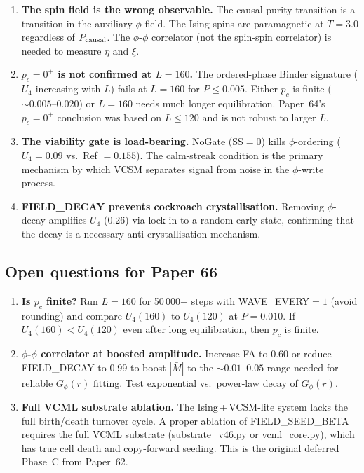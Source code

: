 \documentclass[12pt,a4paper]{article}
\begin{document}
\begin{enumerate}
  \item \textbf{The spin field is the wrong observable.}
    The causal-purity transition is a transition in the auxiliary $\phi$-field.
    The Ising spins are paramagnetic at $T=3.0$ regardless of $P_{\rm causal}$.
    The $\phi$-$\phi$ correlator (not the spin-spin correlator) is needed to measure $\eta$ and $\xi$.

  \item \textbf{$p_c = 0^+$ is not confirmed at $L=160$.}
    The ordered-phase Binder signature ($U_4$ increasing with $L$) fails
    at $L=160$ for $P \leq 0.005$.
    Either $p_c$ is finite ($\sim 0.005$--$0.020$) or $L=160$ needs much longer equilibration.
    Paper~64's $p_c = 0^+$ conclusion was based on $L \leq 120$ and is not robust to larger $L$.

  \item \textbf{The viability gate is load-bearing.}
    NoGate (SS$=0$) kills $\phi$-ordering ($U_4 = 0.09$ vs.\ Ref $= 0.155$).
    The calm-streak condition is the primary mechanism by which VCSM
    separates signal from noise in the $\phi$-write process.

  \item \textbf{FIELD\_DECAY prevents cockroach crystallisation.}
    Removing $\phi$-decay amplifies $U_4$ ($0.26$) via lock-in to a random early state,
    confirming that the decay is a necessary anti-crystallisation mechanism.
\end{enumerate}

\subsection{Open questions for Paper 66}

\begin{enumerate}
  \item \textbf{Is $p_c$ finite?}
    Run $L=160$ for 50\,000+ steps with WAVE\_EVERY$=1$ (avoid rounding)
    and compare $U_4(160)$ to $U_4(120)$ at $P = 0.010$.
    If $U_4(160) < U_4(120)$ even after long equilibration,
    then $p_c$ is finite.

  \item \textbf{$\phi$-$\phi$ correlator at boosted amplitude.}
    Increase FA to 0.60 or reduce FIELD\_DECAY to 0.99 to boost $|\bar{M}|$
    to the $\sim 0.01$--$0.05$ range needed for reliable $G_\phi(r)$ fitting.
    Test exponential vs.\ power-law decay of $G_\phi(r)$.

  \item \textbf{Full VCML substrate ablation.}
    The Ising\,+\,VCSM-lite system lacks the full birth/death turnover cycle.
    A proper ablation of FIELD\_SEED\_BETA requires the full VCML substrate
    (substrate\_v46.py or vcml\_core.py), which has true cell death and
    copy-forward seeding. This is the original deferred Phase~C from Paper~62.
\end{enumerate}
\end{document}
